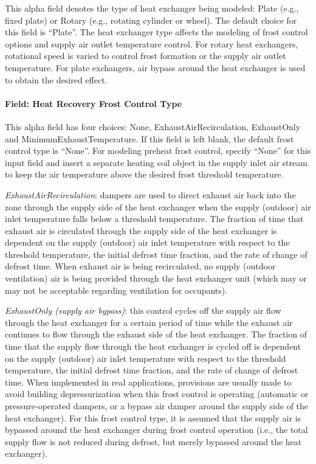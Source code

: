 This alpha field denotes the type of heat exchanger being modeled: Plate (e.g., fixed plate) or Rotary (e.g., rotating cylinder or wheel). The default choice for this field is ``Plate''. The heat exchanger type affects the modeling of frost control options and supply air outlet temperature control. For rotary heat exchangers, rotational speed is varied to control frost formation or the supply air outlet temperature. For plate exchangers, air bypass around the heat exchanger is used to obtain the desired effect.

\paragraph{Field: Heat Recovery Frost Control Type}\label{field-heat-recovery-frost-control-type-3}

This alpha field has four choices: None, ExhaustAirRecirculation, ExhaustOnly and MinimumExhaustTemperature. If this field is left blank, the default frost control type is ``None''. For modeling preheat frost control, specify ``None'' for this input field and insert a separate heating coil object in the supply inlet air stream to keep the air temperature above the desired frost threshold temperature.

\emph{ExhaustAirRecirculation}: dampers are used to direct exhaust air back into the zone through the supply side of the heat exchanger when the supply (outdoor) air inlet temperature falls below a threshold temperature. The fraction of time that exhaust air is circulated through the supply side of the heat exchanger is dependent on the supply (outdoor) air inlet temperature with respect to the threshold temperature, the initial defrost time fraction, and the rate of change of defrost time. When exhaust air is being recirculated, no supply (outdoor ventilation) air is being provided through the heat exchanger unit (which may or may not be acceptable regarding ventilation for occupants).

\emph{ExhaustOnly (supply air bypass)}: this control cycles off the supply air flow through the heat exchanger for a certain period of time while the exhaust air continues to flow through the exhaust side of the heat exchanger. The fraction of time that the supply flow through the heat exchanger is cycled off is dependent on the supply (outdoor) air inlet temperature with respect to the threshold temperature, the initial defrost time fraction, and the rate of change of defrost time. When implemented in real applications, provisions are usually made to avoid building depressurization when this frost control is operating (automatic or pressure-operated dampers, or a bypass air damper around the supply side of the heat exchanger). For this frost control type, it is assumed that the supply air is bypassed around the heat exchanger during frost control operation (i.e., the total supply flow is not reduced during defrost, but merely bypassed around the heat exchanger).

